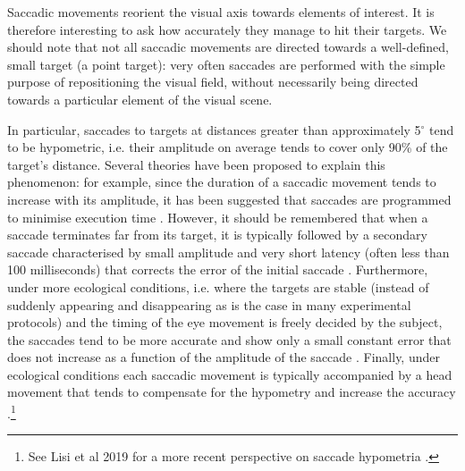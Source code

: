 \documentclass[11pt]{article}
\begin{document}
Saccadic movements reorient the visual axis towards elements of interest. It is therefore interesting to ask how accurately they manage to hit their targets. We should note that not all saccadic movements are directed towards a well-defined, small target (a point target): very often saccades are performed with the simple purpose of repositioning the visual field, without necessarily being directed towards a particular element of the visual scene.

In particular, saccades to targets at distances greater than approximately 5$^{\circ}$ tend to be hypometric, i.e. their amplitude on average tends to cover only 90\% of the target's distance. Several theories have been proposed to explain this phenomenon: for example, since the duration of a saccadic movement tends to increase with its amplitude, it has been suggested that saccades are programmed to minimise execution time \cite{Harris1995}. However, it should be remembered that when a saccade terminates far from its target, it is typically followed by a secondary saccade characterised by small amplitude and very short latency (often less than 100 milliseconds) that corrects the error of the initial saccade \cite{Jacobs1987}. Furthermore, under more ecological conditions, i.e. where the targets are stable (instead of suddenly appearing and disappearing as is the case in many experimental protocols) and the timing of the eye movement is freely decided by the subject, the saccades tend to be more accurate and show only a small constant error that does not increase as a function of the amplitude of the saccade \cite{Collewijn1988}. Finally, under ecological conditions each saccadic movement is typically accompanied by a head movement that tends to compensate for the hypometry and increase the accuracy \cite{Guitton1987}.\footnote{\scriptsize{See Lisi et al 2019 for a more recent perspective on saccade hypometria \cite{Lisi2019}.}}
\end{document}
